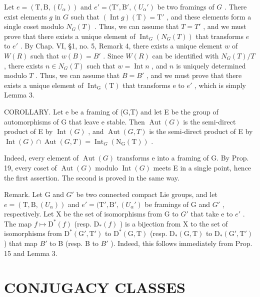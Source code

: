 Let \(e = (\mathrm{T}, \mathrm{B}, (U_{\alpha}))\) and \(e' = (\mathrm{T}', \mathrm{B}', (U_{\alpha}')\) be two framings of \(G\) . There exist elements \(g\) in \(G\) such that \((\operatorname{Int} g)(\mathrm{T}) = \mathrm{T}'\) , and these elements form a single coset modulo \(N_G(T)\) . Thus, we can assume that \(T = T'\) , and we must prove that there exists a unique element of \(\operatorname{Int}_G(N_G(T))\) that transforms \(e\) to \(e'\) . By Chap. VI, §1, no. 5, Remark 4, there exists a unique element \(w\) of \(W(R)\) such that \(w(B) = B'\) . Since \(W(R)\) can be identified with \(N_G(T)/T\) , there exists \(n \in N_G(T)\) such that \(w = \operatorname{Int} n\) , and \(n\) is uniquely determined modulo \(T\) . Thus, we can assume that \(B = B'\) , and we must prove that there exists a unique element of \(\operatorname{Int}_{\mathrm{G}}(\mathrm{T})\) that transforms e to \(e'\) , which is simply Lemma 3.

COROLLARY. Let e be a framing of (G,T) and let E be the group of automorphisms of G that leave e stable. Then \(\operatorname{Aut}(G)\) is the semi-direct product of E by \(\operatorname{Int}(G)\) , and \(\operatorname{Aut}(G,T)\) is the semi-direct product of E by \(\operatorname{Int}(G)\cap\operatorname{Aut}(G,T)=\operatorname{Int}_{G}(\mathrm{N}_{\mathrm{G}}(\mathrm{T}))\) .

Indeed, every element of \(\operatorname{Aut}(G)\) transforms e into a framing of G. By Prop. 19, every coset of \(\operatorname{Aut}(G)\) modulo \(\operatorname{Int}(G)\) meets E in a single point, hence the first assertion. The second is proved in the same way.

Remark. Let G and \(G'\) be two connected compact Lie groups, and let \(e = (\mathrm{T}, \mathrm{B}, (U_{\alpha}))\) and \(e' = (\mathrm{T}', \mathrm{B}', (U_{\alpha}')\) be framings of G and \(G'\) , respectively. Let X be the set of isomorphisms from G to \(G'\) that take e to \(e'\) . The map \(f \mapsto \mathrm{D}^{*}(f)\) (resp. \(\mathrm{D}_{*}(f)\) ) is a bijection from X to the set of isomorphisms from \(\mathrm{D}^{*}(\mathrm{G}', \mathrm{T}')\) to \(\mathrm{D}^{*}(\mathrm{G}, \mathrm{T})\) (resp. \(\mathrm{D}_{*}(\mathrm{G}, \mathrm{T})\) to \(\mathrm{D}_{*}(\mathrm{G}', \mathrm{T}')\) ) that map \(B'\) to B (resp. B to \(B'\) ). Indeed, this follows immediately from Prop. 15 and Lemma 3.

\section{CONJUGACY CLASSES}


